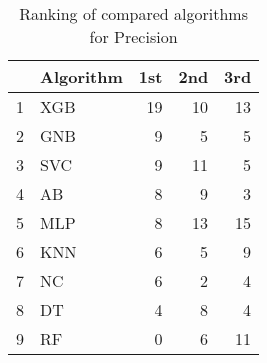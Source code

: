 \begin{table}
\footnotesize
\caption{Ranking of compared algorithms for Precision}
\label{tab:places Precision}
\begin{tabular}{llrrr}
\hline
 & Algorithm & 1st & 2nd & 3rd \\
\hline
1 & XGB & 19 & 10 & 13 \\
2 & GNB & 9 & 5 & 5 \\
3 & SVC & 9 & 11 & 5 \\
4 & AB & 8 & 9 & 3 \\
5 & MLP & 8 & 13 & 15 \\
6 & KNN & 6 & 5 & 9 \\
7 & NC & 6 & 2 & 4 \\
8 & DT & 4 & 8 & 4 \\
9 & RF & 0 & 6 & 11 \\
\hline
\end{tabular}
\end{table}
